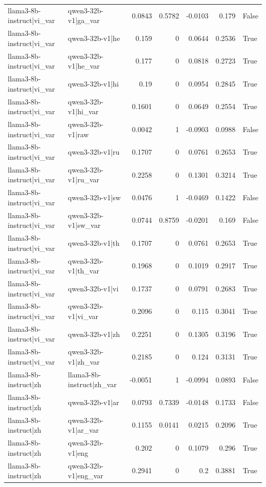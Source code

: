 \begin{table}
\begin{tabular}{l l r r r r l}
llama3-8b-instruct|vi_var & qwen3-32b-v1|ga_var & 0.0843 & 0.5782 & -0.0103 & 0.179 & False \\
llama3-8b-instruct|vi_var & qwen3-32b-v1|he & 0.159 & 0 & 0.0644 & 0.2536 & True \\
llama3-8b-instruct|vi_var & qwen3-32b-v1|he_var & 0.177 & 0 & 0.0818 & 0.2723 & True \\
llama3-8b-instruct|vi_var & qwen3-32b-v1|hi & 0.19 & 0 & 0.0954 & 0.2845 & True \\
llama3-8b-instruct|vi_var & qwen3-32b-v1|hi_var & 0.1601 & 0 & 0.0649 & 0.2554 & True \\
llama3-8b-instruct|vi_var & qwen3-32b-v1|raw & 0.0042 & 1 & -0.0903 & 0.0988 & False \\
llama3-8b-instruct|vi_var & qwen3-32b-v1|ru & 0.1707 & 0 & 0.0761 & 0.2653 & True \\
llama3-8b-instruct|vi_var & qwen3-32b-v1|ru_var & 0.2258 & 0 & 0.1301 & 0.3214 & True \\
llama3-8b-instruct|vi_var & qwen3-32b-v1|sw & 0.0476 & 1 & -0.0469 & 0.1422 & False \\
llama3-8b-instruct|vi_var & qwen3-32b-v1|sw_var & 0.0744 & 0.8759 & -0.0201 & 0.169 & False \\
llama3-8b-instruct|vi_var & qwen3-32b-v1|th & 0.1707 & 0 & 0.0761 & 0.2653 & True \\
llama3-8b-instruct|vi_var & qwen3-32b-v1|th_var & 0.1968 & 0 & 0.1019 & 0.2917 & True \\
llama3-8b-instruct|vi_var & qwen3-32b-v1|vi & 0.1737 & 0 & 0.0791 & 0.2683 & True \\
llama3-8b-instruct|vi_var & qwen3-32b-v1|vi_var & 0.2096 & 0 & 0.115 & 0.3041 & True \\
llama3-8b-instruct|vi_var & qwen3-32b-v1|zh & 0.2251 & 0 & 0.1305 & 0.3196 & True \\
llama3-8b-instruct|vi_var & qwen3-32b-v1|zh_var & 0.2185 & 0 & 0.124 & 0.3131 & True \\
llama3-8b-instruct|zh & llama3-8b-instruct|zh_var & -0.0051 & 1 & -0.0994 & 0.0893 & False \\
llama3-8b-instruct|zh & qwen3-32b-v1|ar & 0.0793 & 0.7339 & -0.0148 & 0.1733 & False \\
llama3-8b-instruct|zh & qwen3-32b-v1|ar_var & 0.1155 & 0.0141 & 0.0215 & 0.2096 & True \\
llama3-8b-instruct|zh & qwen3-32b-v1|eng & 0.202 & 0 & 0.1079 & 0.296 & True \\
llama3-8b-instruct|zh & qwen3-32b-v1|eng_var & 0.2941 & 0 & 0.2 & 0.3881 & True \\

\end{tabular}
\end{table}
